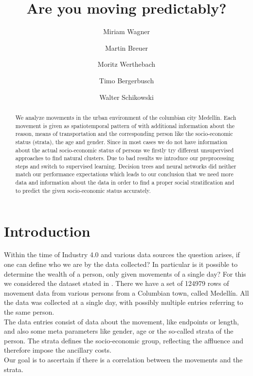 \documentclass[runningheads]{llncs}
\begin{document}
	
	
	\title{Are you moving predictably?}
	\author{Miriam Wagner\and
		Martin Breuer\and
		Moritz Werthebach\and
		Timo Bergerbusch\and
		Walter Schikowski}
	\maketitle              %
	\begin{abstract} %
		We analyze movements in the urban environment of the columbian city Medellín. Each movement is given as spatiotemporal pattern of with additional information about the reason, means of transportation and the corresponding person like the socio-economic status (strata), the age and gender. Since in most cases we do not have information about the actual socio-economic status of persons we firstly try different unsupervised approaches to find natural clusters. Due to bad results we introduce our preprocessing steps and switch to supervised learning. Decision trees and neural networks did neither match our performance expectations which leads to our conclusion that we need more data and information about the data in order to find a proper social stratification and to predict the given socio-economic status accurately.
		
	\end{abstract}
	\section{Introduction} \label{sec: introduction}
	Within the time of Industry 4.0 and various data sources the question arises, if one can define who we are by the data collected? In particular is it possible to determine the wealth of a person, only given movements of a single day?
	For this we considered the dataset stated in \cite{rich_do_not_rise_early}. There we have a set of 124979 rows of movement data from various persons from a Columbian town, called Medellín. All the data was collected at a single day, with possibly multiple entries referring to the same person.\\
	The data entries consist of data about the movement, like endpoints or length, and also some meta parameters like gender, age or the so-called strata of the person. The strata defines the socio-economic group, reflecting the affluence and therefore impose the ancillary costs.\\
	Our goal is to ascertain if there is a correlation between the movements and the strata. 
	
\end{document}
